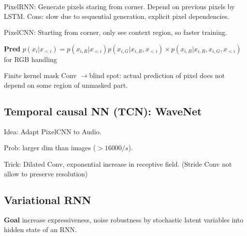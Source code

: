 PixelRNN: Generate pixels staring from corner. Depend on previous pixels by LSTM. Cons: slow due to sequential generation, explicit pixel dependencies.

PixelCNN: Starting from corner, only see context region, so faster training.

\begin{small}
\textbf{Pred} \(p(x_{i} | x_{<i})=p(x_{i, R} | x_{<i}) p(x_{i, G} | x_{i, R}, x_{<i}) \times p(x_{i, B} | x_{i, R}, x_{i, G}, x_{<i})\) for RGB handling
\end{small}

Finite kernel mask Conv \(\to\)blind spot: actual prediction of pixel does not depend on some region of unmasked part.






\subsection*{Temporal causal NN (TCN): WaveNet}

Idea: Adapt PixelCNN to Audio.

Prob: larger dim than images (\(>16000/{s}\)).

Trick: Dilated Conv, exponential increase in receptive field. (Stride Conv not allow to preserve resolution)

\subsection*{Variational RNN}

\textbf{Goal} increase expressiveness, noise robustness by stochastic latent variables into hidden state of an RNN.

